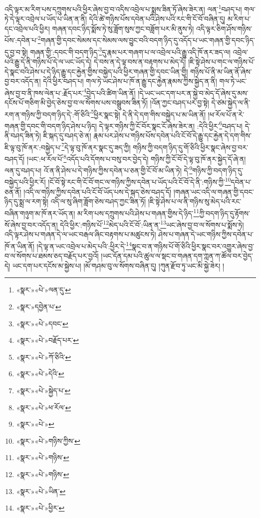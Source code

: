 འདི་ལྟར་མ་རིག་པས་དཀྲུགས་པའི་ཕྱིར་ཞེས་བྱ་བ་འདིས་འབྲེལ་པ་སྨྲས་ཟིན་ཏོ་ཞེས་ཟེར་ན། ལན་\footnote{«སྣར་»«པེ་»ལན་དུ་}བཤད་པ། གལ་ཏེ་དེ་ལྟར་འབྲེལ་པ་ཡོད་པ་ཡིན་ན་ནི། དེའི་ཚེ་གཉིས་པོས་དབེན་པའི་ཤེས་པའི་རང་གི་ངོ་བོ་བཞིན་དུ། མ་རིག་པ་དང་འབྲེལ་པའི་ཕྱིར། གཞན་དབང་ཉིད་སྨོས་ཏེ་སུ་ཟློག་སུས་ཀྱང་བཟློག་པར་མི་ནུས་ཏེ། འདི་ལྟར་ཅིག་ཤོས་གཉིས་པོས་:དབེན་པ་\footnote{«སྣར་»དབྱེན་པ་}གཞན་གྱི་དབང་སེམས་དང་སེམས་ལས་བྱུང་བའི་བདག་ཉིད་དུ་འདོད་པ་ཡང་གཞན་གྱི་དབང་ཉིད་དུ་བྱ་བ་སྟེ། གཞན་གྱི་:དབང་གི་བདག་ཉིད་\footnote{«སྣར་»«པེ་»དབང་}དུ་རྣམ་པར་གཞག་པ་ལ་འབྲེལ་པའི་རྒྱུ་འདི་ཁོ་ནར་ཟད་ལ། འབྲེལ་པའི་རྒྱུ་དེ་ནི་གཉིས་པོ་དེ་ལ་ཡང་ཡོད་དེ། དེ་བས་ན་དེ་ལྟ་བས་ན་བརྟགས་པ་མེད་དོ། །ཇི་སྟེ་ཤེས་པ་གང་ལ་གཉིས་པོ་དེ་སྣང་བའི་ཤེས་པ་དེ་ཉིད་རྒྱུ་དང་རྐྱེན་གྱིས་བསྐྱེད་པའི་ཕྱིར་གཞན་གྱི་དབང་ཡིན་གྱི། གཉིས་པོ་ནི་མ་ཡིན་ནོ་ཞེས་བྱ་བར་འདོད་ན། དེའི་ཕྱིར་བཤད་པ། གལ་ཏེ་ཡང་ཤེས་པ་ཁོ་ན་རྒྱུ་དང་རྐྱེན་རྣམས་ཀྱིས་སྐྱེད་ན་ནི། གལ་ཏེ་ཡང་ཞེས་བྱ་བ་ནི་ཁས་ལེན་པ་:རྗོད་པར་\footnote{«སྣར་»«པེ་»བརྗོད་པར་}བྱེད་པའི་ཚིག་ཡིན་ནོ། །དེ་ཡང་ཡང་དག་པར་ན་སྐྱེ་བ་མེད་དོ་ཞེས་དུ་མས་དངོས་པོ་གཅིག་མི་བྱེད་ཅེས་བྱ་བ་ལ་སོགས་པས་བསྒྲུབས་ཟིན་ཏོ། །འོན་ཀྱང་བཤད་པར་བྱ་སྟེ། དེ་ཙམ་སྐྱེད་ལ་ནི་རག་ན་གཉིས་ཀྱི་བདག་ཉིད་དེ་:གོ་ཅིའི་\footnote{«སྣར་»«པེ་»ཀོ་ཅིའི་}ཕྱིར་སྣང་སྟེ། དེ་ནི་དེ་དག་གིས་བསྐྱེད་པ་མ་ཡིན་ནོ། །ཕ་རོལ་པོ་ན་རེ་གཞན་གྱི་དབང་གི་བདག་ཉིད་ཤེས་པ་ཉིད། དེ་ལྟར་གཉིས་ཀྱི་ངོ་བོར་སྣང་ངོ་ཞེས་ཟེར་ན། :དེའི་ཕྱིར་\footnote{«སྣར་»«པེ་»དེའི་}བཤད་པ། དེ་ནི་བཤད་ཟིན་ཏེ། ཇི་སྐད་དུ་བཤད་ཅེ་ན། རྣམ་པར་ཤེས་པ་གཉིས་པོས་དབེན་པའི་ངོ་བོ་དེ་རྒྱུ་དང་རྐྱེན་དེ་དག་གིས་ཇི་ལྟ་བུ་ཁོ་ནར་:བསྐྱེད་པ་\footnote{«སྣར་»«པེ་»སྐྱེད་པ་}དེ་ལྟ་བུ་ཁོ་ནར་སྣང་དུ་ཟད་ཀྱི། གཉིས་ཀྱི་བདག་ཉིད་དུ་གོ་ཅིའི་ཕྱིར་སྣང་ཞེས་བྱ་བར་བཤད་དོ། །ཡང་:ཕ་རོལ་པོ་\footnote{«སྣར་»«པེ་»ཕ་རོལ་}འདོད་པའི་དོགས་པ་བསུ་བར་བྱེད་དེ། གཉིས་ཀྱི་ངོ་བོ་དེ་ལྟ་བུ་ཁོ་ནར་སྐྱེད་དོ་ཞེ་ན། ལན་དུ་བཤད་པ། འོ་ན་ནི་ཤེས་པ་དེ་གཉིས་ཀྱིས་དབེན་པ་ཅན་གྱི་ངོ་བོ་མ་ཡིན་ཏེ། དེ་\footnote{«སྣར་»«པེ་»}གཉིས་ཀྱི་བདག་ཉིད་དུ་བསྐྱེད་པའི་ཕྱིར་རོ། །ངོ་བོ་སྟེ་རང་གི་ངོ་བོ་གང་ལ་གཉིས་ཀྱིས་དབེན་པ་ཡོད་པའི་ངོ་བོ་དེ་ནི་:གཉིས་ཀྱི་\footnote{«སྣར་»«པེ་»གཉིས་ཀྱིས་}དབེན་པ་ཅན་ནོ། །འདི་ལ་གཉིས་ཀྱིས་དབེན་པའི་ངོ་བོ་ཡོད་པས་དེ་སྐད་ཅེས་བཤད་དོ། །གཞན་ཡང་འདི་ལ་གཞན་གྱི་དབང་ཉིད་དུ་སྨྲ་ལ་རག་སྟེ། འདི་ལ་སུ་ཞིག་ཟློག་ཅེས་བཤད་ཀྱང་ཟིན་ཏོ། །ཇི་སྟེ་ཤེས་པ་ལ་ནི་གཉིས་སུ་མེད་པའི་རང་བཞིན་གཉུག་མ་ཁོ་ནར་ཡོད་ན། མ་རིག་པས་དཀྲུགས་པའི་ཤེས་པ་གཞན་གྱིས་དེ་ཉིད་\footnote{«སྣར་»«པེ་»གཉིས་}ཀྱི་བདག་ཉིད་དུ་རྟོགས་སོ་ཞེས་བྱ་བར་འདོད་ན། དེའི་ཕྱིར་:གཉིས་པོ་\footnote{«སྣར་»«པེ་»གཉིས་}མེད་པའི་ངོ་བོ་:ཡིན་ན་\footnote{«སྣར་»«པེ་»ཡིན་}ཡང་ཞེས་བྱ་བ་ལ་སོགས་པ་སྨོས་ཏེ། འདི་ལྟར་ཤེས་པ་གཞན་དེ་ལ་ཡང་བརྒལ་ཞིང་བརྟགས་པ་མཚུངས་ཏེ། ཤེས་པ་གཞན་དེ་ཡང་གཉིས་ཀྱིས་དབེན་པ་ཁོ་ན་ཡིན་ནོ། །དེ་ལྟ་ན་ཡང་འབྲེལ་པ་མེད་པའི་:ཕྱིར་དེ་\footnote{«སྣར་»«པེ་»ཕྱིར་}སྣང་བ་ན་གཉིས་པོ་གོ་ཅིའི་ཕྱིར་སྣང་བར་འགྱུར་ཞེས་བྱ་བ་ལ་སོགས་པ་ཐམས་ཅད་བརྗོད་པར་བྱའོ། །ཡང་དོན་དམ་པའི་ཚུལ་ལ་སྡང་བ་གཞན་དག་ཀླན་ཀ་ཚོལ་བར་བྱེད་དེ། ཡང་དག་པར་དངོས་མ་སྐྱེས་པ། །མོ་གཤམ་བུ་ལ་སོགས་བཞིན་དུ། །ཀུན་རྫོབ་ཏུ་ཡང་མི་སྐྱེ་ཟེར། །
